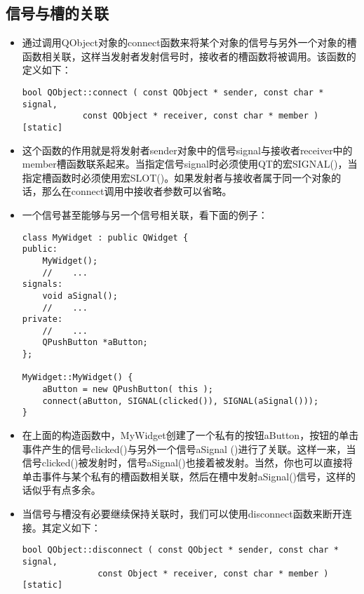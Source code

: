 \documentclass[9pt,b5paper]{article}
\begin{document}
\subsection{信号与槽的关联}
\label{sec-1-4}
\begin{itemize}
\item 通过调用QObject对象的connect函数来将某个对象的信号与另外一个对象的槽函数相关联，这样当发射者发射信号时，接收者的槽函数将被调用。该函数的定义如下：
\lstset{language=java,label= ,caption= ,numbers=none}
\begin{lstlisting}
bool QObject::connect ( const QObject * sender, const char * signal,  
			const QObject * receiver, const char * member ) [static]
\end{lstlisting}

\item 这个函数的作用就是将发射者sender对象中的信号signal与接收者receiver中的member槽函数联系起来。当指定信号signal时必须使用QT的宏SIGNAL()，当指定槽函数时必须使用宏SLOT()。如果发射者与接收者属于同一个对象的话，那么在connect调用中接收者参数可以省略。
\item 一个信号甚至能够与另一个信号相关联，看下面的例子：

\lstset{language=java,label= ,caption= ,numbers=none}
\begin{lstlisting}
class MyWidget : public QWidget {  
public:  
    MyWidget();  
    //    ...  
signals:  
    void aSignal();  
    //    ...  
private:  
    //    ...  
    QPushButton *aButton;  
};  

MyWidget::MyWidget() {  
    aButton = new QPushButton( this );  
    connect(aButton, SIGNAL(clicked()), SIGNAL(aSignal()));  
}
\end{lstlisting}

\item 在上面的构造函数中，MyWidget创建了一个私有的按钮aButton，按钮的单击事件产生的信号clicked()与另外一个信号aSignal ()进行了关联。这样一来，当信号clicked()被发射时，信号aSignal()也接着被发射。当然，你也可以直接将单击事件与某个私有的槽函数相关联，然后在槽中发射aSignal()信号，这样的话似乎有点多余。
\item 当信号与槽没有必要继续保持关联时，我们可以使用disconnect函数来断开连接。其定义如下：
\lstset{language=java,label= ,caption= ,numbers=none}
\begin{lstlisting}
bool QObject::disconnect ( const QObject * sender, const char * signal,  
			   const Object * receiver, const char * member ) [static]
\end{lstlisting}


\end{itemize}
\end{document}
